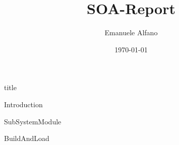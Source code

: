 \documentclass[a4paper,10pt]{article}
\title{SOA-Report}
\author{Emanuele Alfano}
\date{\today}
\begin{document}

{title}

\frontmatter

\tableofcontents


\mainmatter


{Introduction}

{SubSystemModule}

\newpage
{BuildAndLoad}


\newpage
\printbibliography[heading = bibintoc]    %
\end{document}
